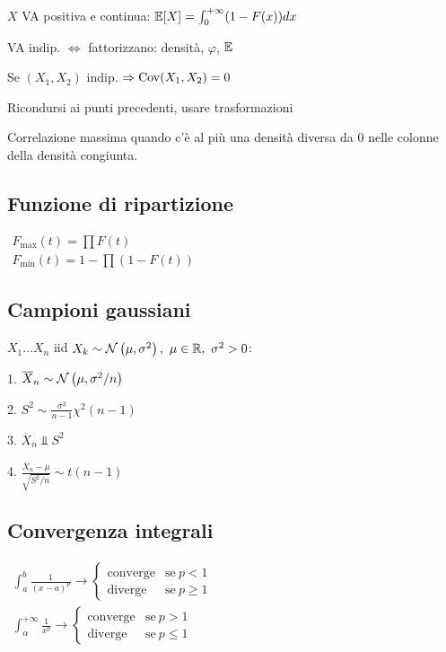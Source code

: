 $X$ VA positiva e continua: $\mathbb E[X]=\int\nolimits^{+\infty}_0 (1-F(x))dx$

VA indip. $\Leftrightarrow $ fattorizzano: densità, $\varphi $, $\mathbb E$

Se $(X_1,X_2)$ indip. $\Rightarrow \operatorname{Cov}(X_1,X_2) =0$

Ricondursi ai punti precedenti, usare trasformazioni

Correlazione massima quando c'è al più una densità diversa da $0$ nelle colonne della densità congiunta.
\subsection{Funzione di ripartizione}

$ \begin{array}{l}
F_{\text{max}}( t) =\prod F( t)\\
F_{\text{min}}( t) =1-\prod ( 1-F( t))
\end{array}$


\subsection{Campioni gaussiani}

$X_1 \dotsc X_n$ iid $X_k \sim \mathcal N\left( \mu ,\sigma^2\right) ,\ \mu \in \mathbb R ,\ \sigma^2 >0$:

1. $\overline{X}_n \sim \mathcal N\left( \mu ,\sigma^2 /n\right)$

2. $S^2 \sim \frac{\sigma^2}{n-1} \chi^2( n-1)$

3. $\overline{X}_n \Bot S^2$

4. $\frac{\overline{X}_n -\mu}{\sqrt{S^2 /n}} \sim t( n-1)$



\subsection{Convergenza integrali}

$ \begin{array}{l}
\int\nolimits^b_a\frac{1}{( x-a)^p}\rightarrow \begin{cases}
\text{converge} & \text{se} \ p< 1\\
\text{diverge} & \text{se} \ p\geq 1
\end{cases}\\
\int\nolimits^{+\infty}_{\alpha}\frac{1}{x^p}\rightarrow \begin{cases}
\text{converge} & \text{se} \ p >1\\
\text{diverge} & \text{se} \ p\leq 1
\end{cases}
\end{array}$

